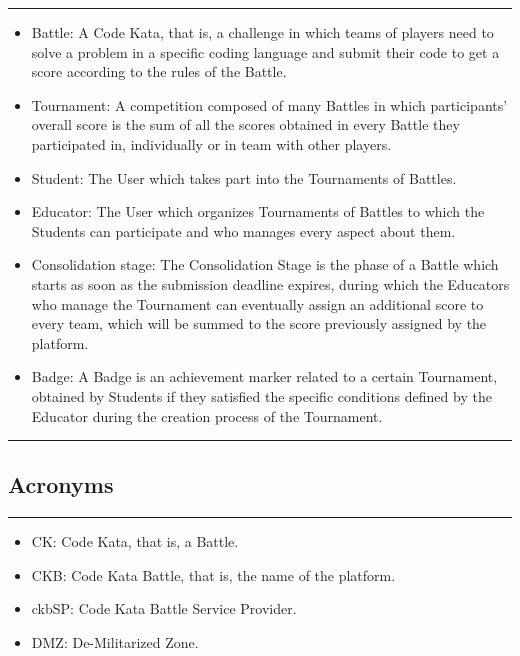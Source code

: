 \documentclass{Configuration_Files/Template}
\begin{document}
{\color{bluepoli}\rule{\linewidth}{0.1pt}}

\begin{itemize}
\item \textcolor{bluepoli}{Battle:} A Code Kata, that is, a challenge in which teams of players need to solve a problem in a specific coding language and submit their code to get a score according to the rules of the Battle.
\item \textcolor{bluepoli}{Tournament:} A competition composed of many Battles in which participants' overall score is the sum of all the scores obtained in every Battle they participated in, individually or in team with other players.
\item \textcolor{bluepoli}{Student:} The User which takes part into the Tournaments of Battles.
\item \textcolor{bluepoli}{Educator:} The User which organizes Tournaments of Battles to which the Students can participate and who manages every aspect about them.
\item \textcolor{bluepoli}{Consolidation stage:} The Consolidation Stage is the phase of a Battle which starts as soon as the submission deadline expires, during which the Educators who manage the Tournament can eventually assign an additional score to every team, which will be summed to the score previously assigned by the platform.
\item \textcolor{bluepoli}{Badge:} A Badge is an achievement marker related to a certain Tournament, obtained by Students if they satisfied the specific conditions defined by the Educator during the creation process of the Tournament.
\end{itemize}

{\color{bluepoli}\rule{\linewidth}{0.1pt}}

\subsection{Acronyms}

{\color{bluepoli}\rule{\linewidth}{0.1pt}}

\begin{itemize}
\item \textcolor{bluepoli}{CK:} Code Kata, that is, a Battle.
\item \textcolor{bluepoli}{CKB:} Code Kata Battle, that is, the name of the platform.
\item \textcolor{bluepoli}{ckbSP:} Code Kata Battle Service Provider.
\item \textcolor{bluepoli}{DMZ:} De-Militarized Zone.
\end{itemize}
\end{document}
